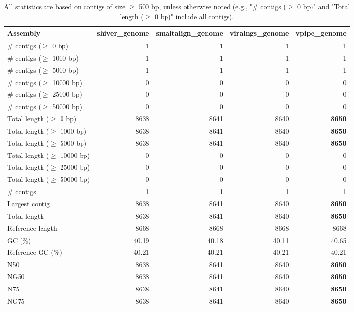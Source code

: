 \documentclass[12pt,a4paper]{article}
\begin{document}
\begin{table}[ht]
\begin{center}
\caption{All statistics are based on contigs of size $\geq$ 500 bp, unless otherwise noted (e.g., "\# contigs ($\geq$ 0 bp)" and "Total length ($\geq$ 0 bp)" include all contigs).}
\begin{tabular}{|l*{4}{|r}|}
\hline
Assembly & shiver\_genome & smaltalign\_genome & viralngs\_genome & vpipe\_genome \\ \hline
\# contigs ($\geq$ 0 bp) & 1 & 1 & 1 & 1 \\ \hline
\# contigs ($\geq$ 1000 bp) & 1 & 1 & 1 & 1 \\ \hline
\# contigs ($\geq$ 5000 bp) & 1 & 1 & 1 & 1 \\ \hline
\# contigs ($\geq$ 10000 bp) & 0 & 0 & 0 & 0 \\ \hline
\# contigs ($\geq$ 25000 bp) & 0 & 0 & 0 & 0 \\ \hline
\# contigs ($\geq$ 50000 bp) & 0 & 0 & 0 & 0 \\ \hline
Total length ($\geq$ 0 bp) & 8638 & 8641 & 8640 & {\bf 8650} \\ \hline
Total length ($\geq$ 1000 bp) & 8638 & 8641 & 8640 & {\bf 8650} \\ \hline
Total length ($\geq$ 5000 bp) & 8638 & 8641 & 8640 & {\bf 8650} \\ \hline
Total length ($\geq$ 10000 bp) & 0 & 0 & 0 & 0 \\ \hline
Total length ($\geq$ 25000 bp) & 0 & 0 & 0 & 0 \\ \hline
Total length ($\geq$ 50000 bp) & 0 & 0 & 0 & 0 \\ \hline
\# contigs & 1 & 1 & 1 & 1 \\ \hline
Largest contig & 8638 & 8641 & 8640 & {\bf 8650} \\ \hline
Total length & 8638 & 8641 & 8640 & {\bf 8650} \\ \hline
Reference length & 8668 & 8668 & 8668 & 8668 \\ \hline
GC (\%) & 40.19 & 40.18 & 40.11 & 40.65 \\ \hline
Reference GC (\%) & 40.21 & 40.21 & 40.21 & 40.21 \\ \hline
N50 & 8638 & 8641 & 8640 & {\bf 8650} \\ \hline
NG50 & 8638 & 8641 & 8640 & {\bf 8650} \\ \hline
N75 & 8638 & 8641 & 8640 & {\bf 8650} \\ \hline
NG75 & 8638 & 8641 & 8640 & {\bf 8650} \\ \hline

\end{tabular}
\end{center}
\end{table}
\end{document}
